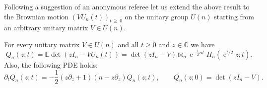 \documentclass[10pt]{amsart}
\theoremstyle{definition}\newtheorem{defi}[theo]{Definition}\newtheorem{rema}[theo]{Remark}\newtheorem{exam}[theo]{Example}\newtheorem{exem}[theo]{Example}\newtheorem{nota}[theo]{Notation}
\DeclareMathOperator{\eee}{e}
\newcommand{\E}{\mathbb{E}}
\newcommand{\C}{\mathbb{C}}
\begin{document}
Following a suggestion of an anonymous referee let us extend the above result to the Brownian motion $(V U_n(t))_{t\,\geq\,0}$ on the unitary group $U(n)$ starting from an arbitrary unitary matrix $V\in U(n)$.

\begin{coro}\label{cor:unitary_BM}
For every unitary matrix $V\in U(n)$ and all $t\geq 0$ and $z\in \C$ we have
\begin{equation}\label{eq:Q_n_def_char_poly_BM_unitary_group}
Q_n(z; t) = \E \det(z I_n - V U_n(t)) =
\det (z I_n-V) \boxtimes_n \eee^{-\frac 12 n t} H_n\left(\eee^{t/2}z; t\right).
\end{equation}
Also, the following PDE holds:
\begin{equation}\label{eq:PDE_unitary_BM}
\partial_t Q_n(z;t) = - \frac 12 (z \partial_z + 1) (n-z\partial_z) Q_n(z;t),\qquad Q_n(z;0) = \det (z I_n-V).
\end{equation}
\end{coro}
\end{document}
